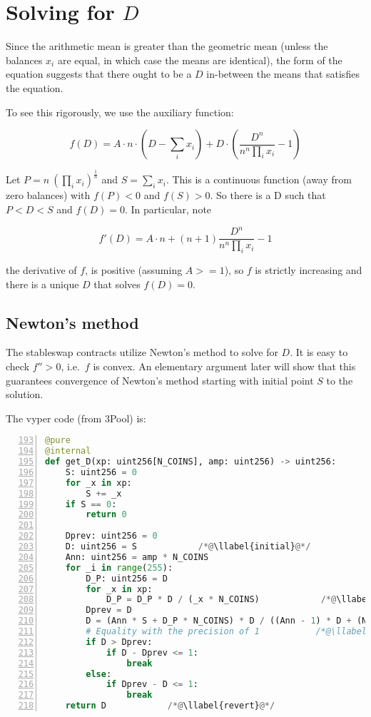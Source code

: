 \documentclass[
]{article}
\makeatletter
\newcounter{llabel}[lstlisting]%
\renewcommand*{\thellabel}{%
    \ifnum\value{llabel}<0 %
      \@ctrerr
    \else
      \ifnum\value{llabel}>10 %
        \@ctrerr
      \else
        \protect\ding{\the\numexpr\value{llabel}+201\relax}%
      \fi
    \fi
  }%
\newlength{\llabelsep}
\newcommand*{\llabel}[1]{%
  \begingroup
    \refstepcounter{llabel}%
    \label{#1}%
    \llap{%
      \thellabel\kern\llabelsep
      \hphantom{\lst@numberstyle\the\lst@lineno}%
      \kern\lst@numbersep
    }%
  \endgroup
}
\makeatother
\begin{document}
\hypertarget{solving-for-d}{%
\section{\texorpdfstring{Solving for
\(D\)}{Solving for D}}\label{solving-for-d}}

Since the arithmetic mean is greater than the geometric mean (unless the
balances \(x_i\) are equal, in which case the means are identical), the
form of the equation suggests that there ought to be a \(D\) in-between
the means that satisfies the equation.

To see this rigorously, we use the auxiliary function:

\[ f(D) = A \cdot n \cdot (D - \sum_i x_i)  + D \cdot (\frac{D^{n}}{n^n \prod_i x_i} - 1) \]

Let \(P = n\ (\prod_i x_i)^{\frac{1}{n}}\) and \(S = \sum_i x_i\). This
is a continuous function (away from zero balances) with \(f(P) < 0\) and
\(f(S) > 0\). So there is a D such that \(P < D < S\) and \(f(D) = 0\).
In particular, note

\[ f'(D) = A\cdot n + (n+1) \frac{D^n}{n^n \prod_i x_i} - 1 \]

the derivative of \(f\), is positive (assuming \(A >= 1\)), so \(f\) is
strictly increasing and there is a unique \(D\) that solves
\(f(D) = 0\).

\hypertarget{newtons-method}{%
\subsection{Newton's method}\label{newtons-method}}

The stableswap contracts utilize Newton's method to solve for \(D\). It
is easy to check \(f'' > 0\), i.e.~\(f\) is convex. An elementary
argument later will show that this guarantees convergence of Newton's
method starting with initial point \(S\) to the solution.

The vyper code (from 3Pool) is:

\begin{lstlisting}[language=Python, numbers=left, firstnumber=193, label=get_D]
@pure
@internal
def get_D(xp: uint256[N_COINS], amp: uint256) -> uint256:
    S: uint256 = 0 
    for _x in xp:
        S += _x
    if S == 0:
        return 0

    Dprev: uint256 = 0
    D: uint256 = S            /*@\llabel{initial}@*/
    Ann: uint256 = amp * N_COINS
    for _i in range(255):
        D_P: uint256 = D
        for _x in xp:
            D_P = D_P * D / (_x * N_COINS)            /*@\llabel{zero_division}@*/
        Dprev = D
        D = (Ann * S + D_P * N_COINS) * D / ((Ann - 1) * D + (N_COINS + 1) * D_P)            /*@\llabel{formula}@*/
        # Equality with the precision of 1           /*@\llabel{convergence}@*/
        if D > Dprev:
            if D - Dprev <= 1:
                break
        else:
            if Dprev - D <= 1:
                break
    return D            /*@\llabel{revert}@*/
\end{lstlisting}
\end{document}
